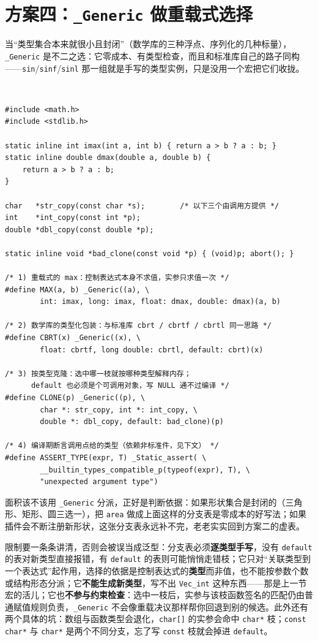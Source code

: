 \documentclass[12pt,a4paper,fontset=fandol]{ctexbook}
\newcommand{\clabel}{%
  \tcbox[on line,colback=cheadbg,colframe=cheadbg,
    boxrule=0pt,arc=1pt,left=2pt,right=2pt,top=1pt,bottom=1pt,
    colupper=white,fontupper=\scriptsize\bfseries]{C}}
\newcommand{\kw}[1]{\texttt{#1}}
\begin{document}
\section{方案四：\kw{\_Generic} 做重载式选择}

当“类型集合本来就很小且封闭”（数学库的三种浮点、序列化的几种标量），\kw{\_Generic} 是不二之选：它零成本、有类型检查，而且和标准库自己的路子同构——\kw{sin}/\kw{sinf}/\kw{sinl} 那一组就是手写的类型实例，只是没用一个宏把它们收拢。

\clabel\ \begin{lstlisting}[style=cstyle,caption={\kw{\_Generic} 的三个典型用法与一个编译期类型断言}]
#include <math.h>
#include <stdlib.h>

static inline int imax(int a, int b) { return a > b ? a : b; }
static inline double dmax(double a, double b) {
    return a > b ? a : b;
}

char   *str_copy(const char *s);        /* 以下三个由调用方提供 */
int    *int_copy(const int *p);
double *dbl_copy(const double *p);

static inline void *bad_clone(const void *p) { (void)p; abort(); }

/* 1) 重载式的 max：控制表达式本身不求值，实参只求值一次 */
#define MAX(a, b) _Generic((a), \
        int: imax, long: imax, float: dmax, double: dmax)(a, b)

/* 2) 数学库的类型化包装：与标准库 cbrt / cbrtf / cbrtl 同一思路 */
#define CBRT(x) _Generic((x), \
        float: cbrtf, long double: cbrtl, default: cbrt)(x)

/* 3) 按类型克隆：选中哪一枝就按哪种类型解释内存；
      default 也必须是个可调用对象，写 NULL 通不过编译 */
#define CLONE(p) _Generic((p), \
        char *: str_copy, int *: int_copy, \
        double *: dbl_copy, default: bad_clone)(p)

/* 4) 编译期断言调用点给的类型（依赖非标准件，见下文） */
#define ASSERT_TYPE(expr, T) _Static_assert( \
        __builtin_types_compatible_p(typeof(expr), T), \
        "unexpected argument type")
\end{lstlisting}

面积该不该用 \kw{\_Generic} 分派，正好是判断依据：如果形状集合是封闭的（三角形、矩形、圆三选一），把 \kw{area} 做成上面这样的分支表是零成本的好写法；如果插件会不断注册新形状，这张分支表永远补不完，老老实实回到方案二的虚表。

限制要一条条讲清，否则会被误当成泛型：分支表必须\textbf{逐类型手写}，没有 \kw{default} 的表对新类型直接报错，有 \kw{default} 的表则可能悄悄走错枝；它只对“关联类型到一个表达式”起作用，选择的依据是控制表达式的\textbf{类型}而非值，也不能按参数个数或结构形态分派；它\textbf{不能生成新类型}，写不出 \kw{Vec\_int} 这种东西——那是上一节宏的活儿；它也\textbf{不参与约束检查}：选中一枝后，实参与该枝函数签名的匹配仍由普通赋值规则负责，\kw{\_Generic} 不会像重载决议那样帮你回退到别的候选。此外还有两个具体的坑：数组与函数类型会退化，\kw{char[]} 的实参会命中 \kw{char*} 枝；\kw{const char*} 与 \kw{char*} 是两个不同分支，忘了写 \kw{const} 枝就会掉进 \kw{default}。
\end{document}
